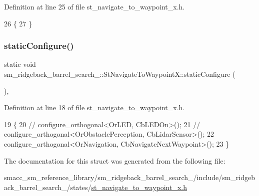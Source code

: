 Definition at line 25 of file st\+\_\+navigate\+\_\+to\+\_\+waypoint\+\_\+x.\+h.


\begin{DoxyCode}
26         \{
27         \}
\end{DoxyCode}
\mbox{\label{structsm__ridgeback__barrel__search__2_1_1StNavigateToWaypointX_a11a0404b21e1627d2e59fb675f8eff93}} 
\subsubsection{\texorpdfstring{static\+Configure()}{staticConfigure()}}
{\footnotesize\ttfamily static void sm\+\_\+ridgeback\+\_\+barrel\+\_\+search\+\_\+::\+St\+Navigate\+To\+Waypoint\+X\+::static\+Configure (\begin{DoxyParamCaption}{ }\end{DoxyParamCaption})\hspace{0.3cm}{\ttfamily [inline]}, {\ttfamily [static]}}



Definition at line 18 of file st\+\_\+navigate\+\_\+to\+\_\+waypoint\+\_\+x.\+h.


\begin{DoxyCode}
19         \{
20             \textcolor{comment}{// configure\_orthogonal<OrLED, CbLEDOn>();}
21             \textcolor{comment}{// configure\_orthogonal<OrObstaclePerception, CbLidarSensor>();}
22             configure\_orthogonal<OrNavigation, CbNavigateNextWaypoint>();
23         \}
\end{DoxyCode}


The documentation for this struct was generated from the following file\+:\begin{DoxyCompactItemize}
\item 
smacc\+\_\+sm\+\_\+reference\+\_\+library/sm\+\_\+ridgeback\+\_\+barrel\+\_\+search\+\_/include/sm\+\_\+ridgeback\+\_\+barrel\+\_\+search\+\_/states/\hyperlink{sm__ridgeback__barrel__search__2_2include_2sm__ridgeback__barrel__search__2_2states_2st__navigate__to__waypoint__x_8h}{st\+\_\+navigate\+\_\+to\+\_\+waypoint\+\_\+x.\+h}\end{DoxyCompactItemize}
